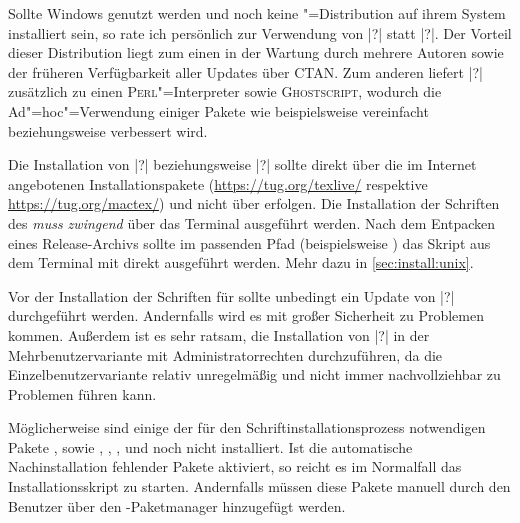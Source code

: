 Sollte Windows genutzt werden und noch keine "=Distribution auf 
ihrem System installiert sein, so rate ich persönlich zur Verwendung von 
|?| statt |?|. 
Der Vorteil dieser Distribution liegt zum einen in der Wartung durch mehrere 
Autoren sowie der früheren Verfügbarkeit aller Updates über CTAN. Zum anderen 
liefert |?| zusätzlich zu  einen 
\textsc{Perl}"=Interpreter sowie \textsc{Ghostscript}, wodurch die 
Ad"=hoc"=Verwendung einiger Pakete wie beispielsweise  
vereinfacht beziehungsweise verbessert wird. 


Die Installation von |?| beziehungsweise 
|?| sollte direkt über die im Internet 
angebotenen Installationspakete (\url{https://tug.org/texlive/} respektive 
\url{https://tug.org/mactex/}) und nicht über  erfolgen. 
%
Die Installation der Schriften des \CDs \emph{muss zwingend} über das Terminal 
ausgeführt werden. Nach dem Entpacken eines Release-Archivs sollte im passenden 
Pfad (beispielsweise ) 
das Skript aus dem Terminal mit  direkt ausgeführt 
werden. Mehr dazu in \autoref{sec:install:unix}.


Vor der Installation der Schriften für \TUDScript sollte unbedingt ein Update 
von |?| durchgeführt werden. Andernfalls wird 
es mit großer Sicherheit zu Problemen kommen. Außerdem ist es sehr ratsam, die 
Installation von |?| in der Mehrbenutzervariante 
mit Administratorrechten durchzuführen, da die Einzelbenutzervariante relativ
unregelmäßig und nicht immer nachvollziehbar zu Problemen führen kann. 

Möglicherweise sind einige der für den Schriftinstallationsprozess notwendigen 
Pakete ,  sowie , 
, ,  und  
noch nicht installiert. Ist die automatische Nachinstallation fehlender Pakete 
aktiviert, so reicht es im Normalfall das Installationsskript zu starten. 
Andernfalls müssen diese Pakete manuell durch den Benutzer über den 
-Paketmanager hinzugefügt werden.

